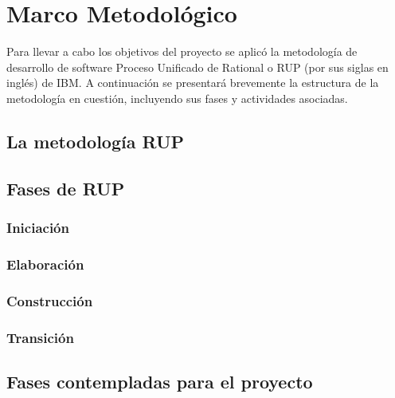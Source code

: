 \chapter{Marco Metodológico}
Para llevar a cabo los objetivos del proyecto se aplicó la metodología de desarrollo de software Proceso Unificado de Rational o RUP (por sus siglas en inglés) de IBM. A continuación se presentará brevemente la estructura de la metodología en cuestión, incluyendo sus fases y actividades asociadas.

\section{La metodología RUP}

\section{Fases de RUP}
\subsection{Iniciación}
\subsection{Elaboración}
\subsection{Construcción}
\subsection{Transición}

\section{Fases contempladas para el proyecto}